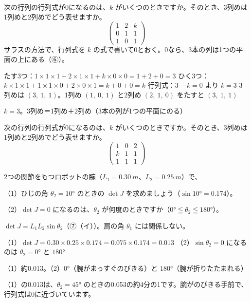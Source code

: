 \begin{reidai}
次の行列の行列式が0になるのは、$k$ がいくつのときですか。そのとき、3列めは1列めと2列めでどう表せますか。
\[ \begin{pmatrix}1&2&k\\0&1&1\\1&0&1\end{pmatrix} \]
\kangaekata サラスの方法で、行列式を $k$ の式で書いて0とおく。0なら、3本の列は1つの平面の上にある（⑥）。\par
\shiki たす3つ：$1\times1\times1+2\times1\times1+k\times0\times0=1+2+0=3$\kviieq
ひく3つ：$k\times1\times1+1\times1\times0+2\times0\times1=k+0+0=k$\kviieq
行列式：$3-k=0$ より $k=3$\kviieq
3列めは $(3,\ 1,\ 1)$。1列め $(1,\ 0,\ 1)$ と2列め $(2,\ 1,\ 0)$ をたすと $(3,\ 1,\ 1)$\par
\kotae $k=3$。3列め＝1列め＋2列め（3本の列が1つの平面にのる）
\end{reidai}

\begin{jibun}
次の行列の行列式が0になるのは、$k$ がいくつのときですか。そのとき、3列めは1列めと2列めでどう表せますか。
\[ \begin{pmatrix}1&0&2\\k&1&1\\1&1&1\end{pmatrix} \]
\end{jibun}

\begin{reidai}[ロボットの腕の行列式]
2つの関節をもつロボットの腕（$L_1=\qty{0.30}{m}$、$L_2=\qty{0.25}{m}$）で、\par
（1）ひじの角 $\theta_2=10°$ のときの $\det J$ を求めましょう（$\sin10°=0.174$）。\par
（2）$\det J=0$ になるのは、$\theta_2$ が何度のときですか（$0°\leqq\theta_2\leqq180°$）。\par
\kangaekata $\det J=L_1L_2\sin\theta_2$（⑦（イ））。肩の角 $\theta_1$ には関係しない。\par
\shiki（1）$\det J=0.30\times0.25\times0.174=0.075\times0.174=0.013$\kviieq
（2）$\sin\theta_2=0$ になるのは $\theta_2=0°$ と $180°$\par
\kotae（1）\nobreak 約0.013。（2）\nobreak $0°$（腕がまっすぐのびきる）と $180°$（腕が折りたたまれる）
\end{reidai}
\noindent （1）の0.013は、$\theta_2=45°$ のときの0.053の約4分の1です。腕がのびきる手前で、行列式は0に近づいています。

